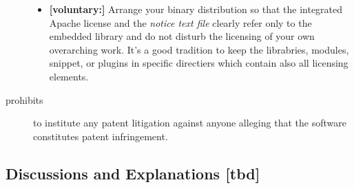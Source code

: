 \begin{description}
\begin{itemize}
 \item \textbf{[voluntary:]} Arrange your binary distribution so that the
  integrated Apache license and the \emph{notice text file} clearly refer only
  to the embedded library and do not disturb the licensing of your own
  overarching work. It's a good tradition to keep the librabries, modules,
  snippet, or plugins in specific directiers which contain also all licensing
  elements.
  
\end{itemize}

\item[prohibits] to institute any patent litigation against anyone alleging that
the software constitutes patent infringement.

\end{description}

\subsection{Discussions and Explanations [tbd]}







%
